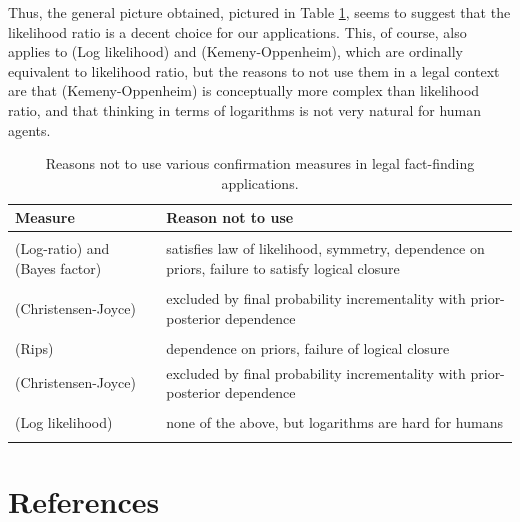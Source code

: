 \documentclass[
  10pt,
  dvipsnames,enabledeprecatedfontcommands]{scrartcl}
\begin{document}
Thus, the general picture obtained, pictured in Table
\ref{tab:confirmation}, seems to suggest that the likelihood ratio is a
decent choice for our applications. This, of course, also applies to
(Log likelihood) and (Kemeny-Oppenheim), which are ordinally equivalent
to likelihood ratio, but the reasons to not use them in a legal context
are that (Kemeny-Oppenheim) is conceptually more complex than likelihood
ratio, and that thinking in terms of logarithms is not very natural for
human agents.

\begin{table}
\centering\begingroup\fontsize{9}{11}\selectfont

\begin{tabular}{lp{10cm}}
\toprule
Measure & Reason not to use\\
\midrule
\cellcolor{gray!6}{(Difference)} & \cellcolor{gray!6}{dependence on priors, logical closure failure}\\
(Log-ratio) and (Bayes factor) & satisfies law of likelihood, symmetry, dependence on priors, failure to satisfy logical closure\\
\cellcolor{gray!6}{(Generalized entailment)} & \cellcolor{gray!6}{dependence on priors, independent conflicting evidence}\\
(Christensen-Joyce) & excluded by final probability incrementality with prior-posterior dependence\\
\cellcolor{gray!6}{(Carnap)} & \cellcolor{gray!6}{excluded by final probability incrementality with prior-posterior dependence, symmetry, logical closure failure}\\
(Rips) & dependence on priors, failure of logical closure\\
(Christensen-Joyce) & excluded by final probability incrementality with prior-posterior dependence\\
\cellcolor{gray!6}{(Kemeny-Oppenheim)} & \cellcolor{gray!6}{none of the above, but unnecessarily complex}\\
(Log likelihood) & none of the above, but logarithms are hard for humans\\
\cellcolor{gray!6}{(Likelihood ratio)} & \cellcolor{gray!6}{none of the above}\\
\bottomrule
\end{tabular}
\endgroup{}
\caption{Reasons not to use various confirmation measures in legal fact-finding applications.}
\label{tab:confirmation}
\end{table}

\hypertarget{references}{%
\section*{References}\label{references}}
\end{document}
